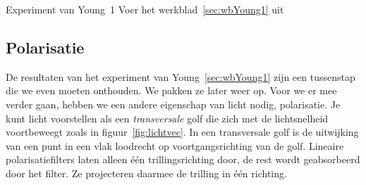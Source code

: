 \documentclass[../../main.tex]{subfiles}
\begin{document}
\medskip
\begin{experiment}{Experiment van Young~1}
Voer het werkblad~\ref{sec:wbYoung1} uit 
\end{experiment}

\subsection*{Polarisatie} \label{sec:eraser}
De resultaten van het experiment van Young~\ref{sec:wbYoung1} zijn een tussenstap die we even moeten onthouden. We pakken ze later weer op. Voor we er mee verder gaan, hebben we een andere eigenschap van licht nodig, polarisatie. Je kunt licht voorstellen als een \textit{transversale} golf  die zich met de lichtsnelheid voortbeweegt zoals in figuur~\ref{fig:lichtvec}. In een transversale golf is de uitwijking van een punt in een vlak loodrecht op voortgangsrichting van de golf. Lineaire polarisatiefilters laten alleen \'e\'en trillingsrichting door, de rest wordt geabsorbeerd door het filter. Ze projecteren daarmee de trilling in \'e\'en richting. 
\end{document}
